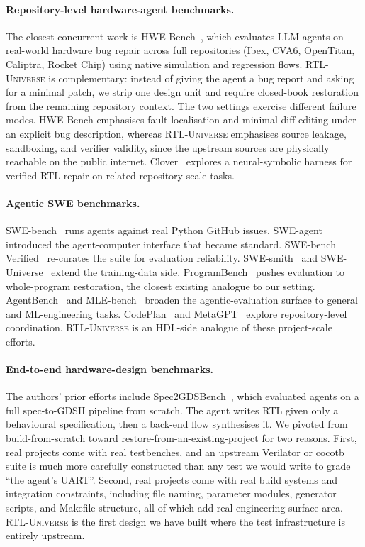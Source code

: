 \documentclass{article}
\begin{document}
\paragraph{Repository-level hardware-agent benchmarks.}
The closest concurrent work is HWE-Bench~\citep{hwebench}, which evaluates LLM agents on
real-world hardware bug repair across full repositories (Ibex, CVA6, OpenTitan, Caliptra,
Rocket Chip) using native simulation and regression flows. \textsc{RTL-Universe} is
complementary: instead of giving the agent a bug report and asking for a minimal patch,
we strip one design unit and require closed-book restoration from the remaining repository
context. The two settings exercise different failure modes. HWE-Bench emphasises fault
localisation and minimal-diff editing under an explicit bug description, whereas
\textsc{RTL-Universe} emphasises source leakage, sandboxing, and verifier validity, since
the upstream sources are physically reachable on the public internet.
Clover~\citep{clover} explores a neural-symbolic harness for verified RTL repair on
related repository-scale tasks.

\paragraph{Agentic SWE benchmarks.}
SWE-bench~\citep{swebench} runs agents against real Python GitHub issues.
SWE-agent~\citep{sweagent} introduced the agent-computer interface that became
standard. SWE-bench Verified~\citep{openai2024swebenchverified} re-curates the suite for evaluation
reliability. SWE-smith~\citep{swesmith} and SWE-Universe~\citep{sweuniverse}
extend the training-data side. ProgramBench~\citep{programbench} pushes evaluation
to whole-program restoration, the closest existing analogue to our setting.
AgentBench~\citep{agentbench} and MLE-bench~\citep{mlebench} broaden the
agentic-evaluation surface to general and ML-engineering tasks.
CodePlan~\citep{codeplan} and MetaGPT~\citep{metagpt} explore
repository-level coordination. \textsc{RTL-Universe} is an HDL-side analogue of these
project-scale efforts.

\paragraph{End-to-end hardware-design benchmarks.}
The authors' prior efforts include Spec2GDSBench~\citep{spec2gdsbench-w1, spec2gdsbench-w2,
spec2gdsbench-w3}, which evaluated agents on a full spec-to-GDSII pipeline from scratch. The
agent writes RTL given only a behavioural specification, then a back-end flow synthesises it.
We pivoted from build-from-scratch toward restore-from-an-existing-project for two reasons.
First, real projects come with real testbenches, and an upstream Verilator or cocotb suite is
much more carefully constructed than any test we would write to grade ``the agent's UART''.
Second, real projects come with real build systems and integration constraints, including
file naming, parameter modules, generator scripts, and Makefile structure, all of which add
real engineering surface area. \textsc{RTL-Universe} is the first design we have built where
the test infrastructure is entirely upstream.
\end{document}
